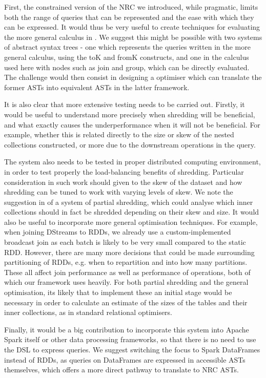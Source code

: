 First, the constrained version of the NRC we introduced, while pragmatic, limits both the range of queries that can be represented and the ease with which they can be expressed.  It would thus be very useful to create techniques for evaluating the more general calculus in \cite{draftpaper}. We suggest this might be possible with two systems of abstract syntax trees - one which represents the queries written in the more general calculus, using the toK and fromK constructs, and one in the calculus used here with nodes such as join and group, which can be directly evaluated. The challenge would then consist in designing a optimiser which can translate the former ASTs into equivalent ASTs in the latter framework.

It is also clear that more extensive testing needs to be carried out. Firstly, it would be useful to understand more precisely when shredding will be beneficial, and what exactly causes the underperformance when it will not be beneficial. For example, whether this is related directly to the size or skew of the nested collections constructed, or more due to the downstream operations in the query.

The system also needs to be tested in proper distributed computing environment, in order to test properly the load-balancing benefits of shredding. Particular consideration in such work should given to the skew of the dataset and how shredding can be tuned to work with varying levels of skew. We note the suggestion in \cite{draftpaper} of a system of partial shredding, which could analyse which inner collections should in fact be shredded depending on their skew and size.
It would also be useful to incorporate more general optimisation techniques. For example, when joining DStreams to RDDs, we already use a custom-implemented broadcast join as each batch is likely to be very small compared to the static RDD. However, there are many more decisions that could be made surrounding partitioning of RDDs, e.g. when to repartition and into how many partitions. These all affect join performance as well as performance of  operations, both of which our framework uses heavily.
For both partial shredding and the general optimisation, its likely that to implement these an initial stage would be necessary in order to calculate an estimate of the sizes of the tables and their inner collections, as in standard relational optimisers.

Finally, it would be a big contribution to incorporate this system into Apache Spark itself or other data processing frameworks, so that there is no need to use the DSL to express queries. We suggest switching the focus to Spark DataFrames instead of RDDs, as queries on DataFrames are expressed in accessible ASTs themselves, which offers a more direct pathway to translate to NRC ASTs.
